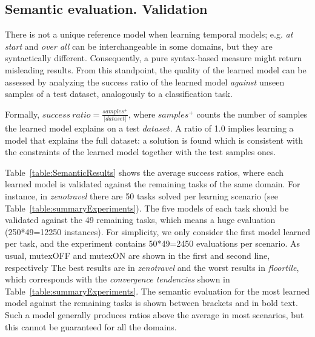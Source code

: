 \documentclass{ecai}
\begin{document}
\subsection{Semantic evaluation. Validation}

There is not a unique reference model when learning temporal models; e.g. \textit{at start} and \textit{over all} can be interchangeable in some domains, but they are syntactically different. Consequently, a pure syntax-based measure might return misleading results. From this standpoint, the quality of the learned model can be assessed by analyzing the success ratio of the learned model \emph{against} unseen samples of a test dataset, analogously to a classification task. 

Formally, $success\ ratio=\frac{samples^{+}}{|dataset|}$, where $samples^{+}$ counts the number of samples the learned model explains on a test $dataset$. A ratio of 1.0 implies learning a model that explains the full dataset: a solution is found which is consistent with the constraints of the learned model together with the test samples ones. 


Table~\ref{table:SemanticResults} shows the average success ratios, where each learned model is validated against the remaining tasks of the same domain.
For instance, in \textit{zenotravel} there are 50 tasks solved per learning scenario (see Table~\ref{table:summaryExperiments}). The five models of each task should be validated against the 49 remaining tasks, which means a huge evaluation (250*49=12250 instances). For simplicity, we only consider the first model learned per task, and the experiment contains 50*49=2450 evaluations per scenario. 
As usual, mutexOFF and mutexON are shown in the first and second line, respectively
The best results are in \textit{zenotravel} and the worst results in \textit{floortile}, which corresponds with the \textit{convergence tendencies} shown in Table~\ref{table:summaryExperiments}. The semantic evaluation for the most learned model against the remaining tasks is shown between brackets and in bold text. 
Such a model generally produces ratios above the average in most scenarios, but this cannot be guaranteed for all the domains.
\end{document}
